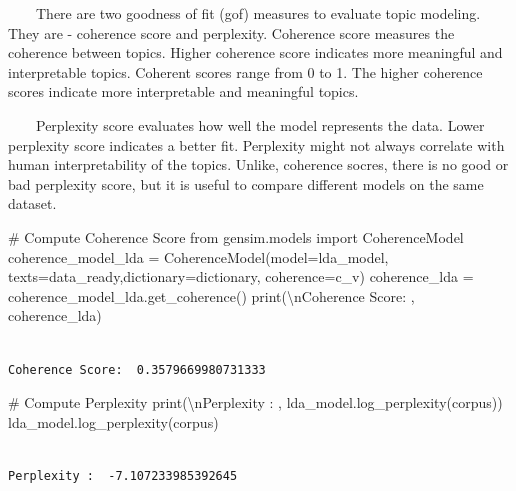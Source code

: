 \documentclass[
  letterpaper,
  DIV=11,
  numbers=noendperiod]{scrreprt}
\newenvironment{Shaded}{\begin{snugshade}}{\end{snugshade}}
\newcommand{\BuiltInTok}[1]{\textcolor[rgb]{0.00,0.23,0.31}{#1}}
\newcommand{\CharTok}[1]{\textcolor[rgb]{0.13,0.47,0.30}{#1}}
\newcommand{\CommentTok}[1]{\textcolor[rgb]{0.37,0.37,0.37}{#1}}
\newcommand{\ImportTok}[1]{\textcolor[rgb]{0.00,0.46,0.62}{#1}}
\newcommand{\NormalTok}[1]{\textcolor[rgb]{0.00,0.23,0.31}{#1}}
\newcommand{\OperatorTok}[1]{\textcolor[rgb]{0.37,0.37,0.37}{#1}}
\newcommand{\StringTok}[1]{\textcolor[rgb]{0.13,0.47,0.30}{#1}}
\begin{document}
~~~~There are two goodness of fit (gof) measures to evaluate topic
modeling. They are - coherence score and perplexity. Coherence score
measures the coherence between topics. Higher coherence score indicates
more meaningful and interpretable topics. Coherent scores range from 0
to 1. The higher coherence scores indicate more interpretable and
meaningful topics.

~~~~Perplexity score evaluates how well the model represents the data.
Lower perplexity score indicates a better fit. Perplexity might not
always correlate with human interpretability of the topics. Unlike,
coherence socres, there is no good or bad perplexity score, but it is
useful to compare different models on the same dataset.

\begin{Shaded}
\begin{Highlighting}[]
\CommentTok{\# Compute Coherence Score}
\ImportTok{from}\NormalTok{ gensim.models }\ImportTok{import}\NormalTok{ CoherenceModel}
\NormalTok{coherence\_model\_lda }\OperatorTok{=}\NormalTok{ CoherenceModel(model}\OperatorTok{=}\NormalTok{lda\_model, texts}\OperatorTok{=}\NormalTok{data\_ready,dictionary}\OperatorTok{=}\NormalTok{dictionary, coherence}\OperatorTok{=}\StringTok{\textquotesingle{}c\_v\textquotesingle{}}\NormalTok{)}
\NormalTok{coherence\_lda }\OperatorTok{=}\NormalTok{ coherence\_model\_lda.get\_coherence()}
\BuiltInTok{print}\NormalTok{(}\StringTok{\textquotesingle{}}\CharTok{\textbackslash{}n}\StringTok{Coherence Score: \textquotesingle{}}\NormalTok{, coherence\_lda)}
\end{Highlighting}
\end{Shaded}

\begin{verbatim}

Coherence Score:  0.3579669980731333
\end{verbatim}

\begin{Shaded}
\begin{Highlighting}[]
\CommentTok{\# Compute Perplexity}
\BuiltInTok{print}\NormalTok{(}\StringTok{\textquotesingle{}}\CharTok{\textbackslash{}n}\StringTok{Perplexity : \textquotesingle{}}\NormalTok{, lda\_model.log\_perplexity(corpus)) }
\NormalTok{lda\_model.log\_perplexity(corpus)}
\end{Highlighting}
\end{Shaded}

\begin{verbatim}

Perplexity :  -7.107233985392645
\end{verbatim}
\end{document}
